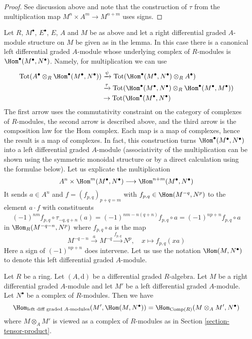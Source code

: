 \begin{proof}
See discussion above and note that the construction of $\tau$
from the multiplication map $M^n \times A^m \to M^{n + m}$
uses signs.
\end{proof}

\noindent
Let $R$, $M^\bullet$, $E^\bullet$, $E$, $A$ and $M$ be as above
and let a right differential graded $A$-module structure on $M$
be given as in the lemma. In this case there is a canonical left
differential graded $A$-module whose underlying complex of $R$-modules is
$\Hom^\bullet(M^\bullet, N^\bullet)$. Namely, for multiplication
we can use
\begin{align*}
\text{Tot}(A^\bullet \otimes_R \Hom^\bullet(M^\bullet, N^\bullet))
& \xrightarrow{\psi}
\text{Tot}(\Hom^\bullet(M^\bullet, N^\bullet) \otimes_R A^\bullet) \\
& \xrightarrow{\tau}
\text{Tot}(\Hom^\bullet(M^\bullet, N^\bullet) \otimes_R
\Hom^\bullet(M^\bullet, M^\bullet)) \\
& \to
\text{Tot}(\Hom^\bullet(M^\bullet, N^\bullet)
\end{align*}
The first arrow uses the commutativity constraint on the category
of complexes of $R$-modules, the second arrow is described above, and
the third arrow is the composition law for the Hom complex.
Each map is a map of complexes, hence the result is a map of complexes.
In fact, this construction turns $\Hom^\bullet(M^\bullet, N^\bullet)$
into a left differential graded $A$-module (associativity of the multiplication
can be shown using the symmetric monoidal structure or by a direct calculation
using the formulae below). Let us explicate the multiplication
$$
A^n \times \Hom^m(M^\bullet, N^\bullet) \longrightarrow
\Hom^{n + m}(M^\bullet, N^\bullet)
$$
It sends $a \in A^n$ and
$f = (f_{p, q})_{p + q = m}$ with $f_{p, q} \in \Hom(M^{-q}, N^p)$
to the element $a \cdot f$ with constituents
$$
(-1)^{nm}f_{p, q} \circ \tau_{-q, q + n}(a) =
(-1)^{nm - n(q + n)}f_{p, q} \circ a =
(-1)^{np + n} f_{p, q} \circ a
$$
in $\Hom_R(M^{-q - n}, N^p)$ where $f_{p, q} \circ a$ is the map
$$
M^{-q - n} \xrightarrow{a} M^{-q} \xrightarrow{f_{p, q}} N^p,\quad
x \longmapsto f_{p, q}(xa)
$$
Here a sign of $(-1)^{np + n}$ does intervene.  Let us use the notation
$\Hom(M, N^\bullet)$ to denote this left differential graded $A$-module.

\begin{lemma}
\label{lemma-characterize-hom-other-side}
Let $R$ be a ring. Let $(A, \text{d})$ be a differential graded $R$-algebra.
Let $M$ be a right differential graded $A$-module and let
$M'$ be a left differential graded $A$-module.
Let $N^\bullet$ be a complex of $R$-modules. Then we have
$$
\Hom_{\text{left diff graded }A\text{-modules}}(M', \Hom(M, N^\bullet)) =
\Hom_{\text{Comp}(R)}(M \otimes_A M', N^\bullet)
$$
where $M \otimes_A M'$ is viewed as a complex of $R$-modules
as in Section \ref{section-tensor-product}.
\end{lemma}

